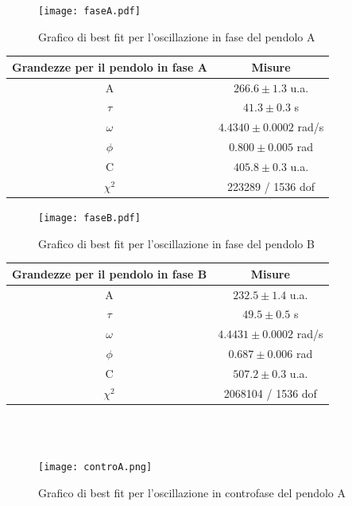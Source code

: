 \documentclass{article}
\begin{document}
\begin{figure} [H]
    \centering
    \texttt{[image: faseA.pdf]}
    \caption{Grafico di best fit per l'oscillazione in fase del pendolo A}
    \label{fig:faseA}
\end{figure}

\begin{center}
\begin{tabular}{cc}
    \toprule
    Grandezze per il pendolo in fase A & Misure \\
     \midrule
    A & $266.6 \pm 1.3$ u.a.\\
    $\tau$ & $41.3 \pm 0.3$ s\\
    $\omega$ & $4.4340 \pm 0.0002$ rad/s\\
    $\phi$ & $0.800 \pm 0.005$ rad\\
    C & $405.8 \pm 0.3$ u.a.\\
    $\chi^2$ & 223289 / 1536 dof\\
    \bottomrule
\end{tabular}
\end{center}

\begin{figure} [H]
    \centering
    \texttt{[image: faseB.pdf]}
    \caption{Grafico di best fit per l'oscillazione in fase del pendolo B}
    \label{fig:faseB}
\end{figure}

\begin{center}
\begin{tabular}{cc}
    \toprule
    Grandezze per il pendolo in fase B & Misure \\
     \midrule
    A & $232.5 \pm 1.4$ u.a.\\
    $\tau$ & $49.5 \pm 0.5$ s\\
    $\omega$ & $4.4431 \pm 0.0002$ rad/s\\
    $\phi$ & $0.687 \pm 0.006$ rad\\
    C & $507.2 \pm 0.3$ u.a.\\
    $\chi^2$ & 2068104 / 1536 dof\\
    \bottomrule
\end{tabular}
\end{center}
\\
\\
\begin{figure} [H]
    \centering
    \texttt{[image: controA.png]}
    \caption{Grafico di best fit per l'oscillazione in controfase del pendolo A}
    \label{fig:controA}
\end{figure}
\end{document}
